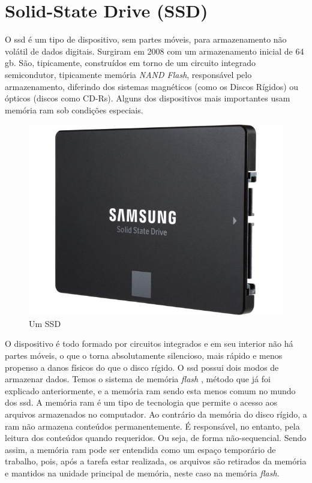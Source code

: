 \documentclass{report}
\begin{document}
\newpage

		\section{Solid-State Drive (SSD)}
		
	O \ac{ssd} é um tipo de dispositivo, sem partes móveis, para armazenamento não volátil de dados digitais. Surgiram em 2008 com um armazenamento inicial de 64 \ac{gb}. São, tipicamente, construídos em torno de um circuito integrado semicondutor, tipicamente memória \textit{NAND Flash}, responsável pelo armazenamento, diferindo dos sistemas magnéticos (como os Discos Rígidos) ou ópticos (discos como CD-Rs). Alguns dos dispositivos mais importantes usam memória \ac{ram} sob condições especiais.
\vspace{5mm}

	\begin{figure} [h]
		\centering
		\includegraphics[scale=0.25]{ssd.jpg}
		\caption{Um SSD}
	\end{figure}
	
\vspace{5mm}	
	
	O dispositivo é todo formado por circuitos integrados e em seu interior não há partes móveis, o que o torna absolutamente silencioso, mais rápido e menos propenso a danos físicos do que o disco rígido.
\vspace{1mm}
	O \ac{ssd} possui dois modos de armazenar dados. Temos o sistema de memória \textit{flash}  , método que já foi explicado anteriormente, e a memória \ac{ram} sendo esta menos comum no mundo dos \ac{ssd}. A memória \ac{ram} é um tipo de tecnologia que permite o acesso aos arquivos armazenados no computador. Ao contrário da memória do disco rígido, a \ac{ram} não armazena conteúdos permanentemente. É responsável, no entanto, pela leitura dos conteúdos quando requeridos. Ou seja, de forma não-sequencial. Sendo assim, a memória \ac{ram} pode ser entendida como um espaço temporário de trabalho, pois, após a tarefa estar realizada, os arquivos são retirados da memória e mantidos na unidade principal de memória, neste caso na memória \textit{flash}.
\vspace{1mm}
	
\end{document}
